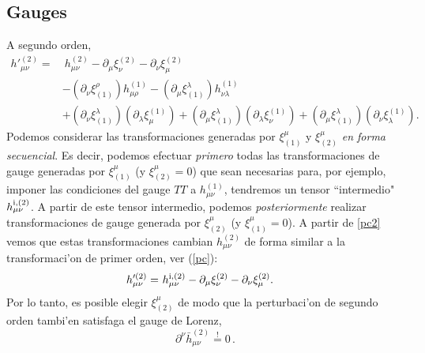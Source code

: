 \subsection{Gauges}
A segundo orden,
\begin{align}\label{pc2}
h'^{(2)}_{\mu\nu} = &\ h^{(2)}_{\mu\nu}- \partial_\mu\xi_\nu^{(2)} - \partial_\nu\xi_\mu^{(2)}\\
&  -(\partial_\nu\xi^\rho_{(1)})h^{(1)}_{\mu\rho} -(\partial_\mu\xi^\lambda_{(1)})h^{(1)}_{\nu\lambda} \\
& +(\partial_\nu\xi^\lambda_{(1)})(\partial_\lambda\xi_\mu^{(1)})
+(\partial_\mu\xi^\lambda_{(1)})(\partial_\lambda\xi_\nu^{(1)})
+(\partial_\mu\xi^\lambda_{(1)})(\partial_\nu\xi_\lambda^{(1)}).
\end{align}
Podemos considerar las transformaciones generadas por $\xi^\mu_{(1)}$ y $\xi^\mu_{(2)}$ \textit{en forma secuencial}. Es decir, podemos efectuar \textit{primero} todas las transformaciones de gauge generadas por $\xi^\mu_{(1)}$ (y $\xi^\mu_{(2)}=0$) que sean necesarias para, por ejemplo, imponer las condiciones del gauge $TT$ a $h^{(1)}_{\mu\nu}$,  tendremos un tensor ``intermedio" $h^{\rm i, (2)}_{\mu\nu}$. A partir de este tensor intermedio, podemos \textit{posteriormente} realizar transformaciones de gauge generada por $\xi^\mu_{(2)}$ (y $\xi^\mu_{(1)}=0$). A partir de \eqref{pc2} vemos que estas transformaciones cambian $h^{(2)}_{\mu\nu}$ de forma similar a la transformaci'on de primer orden, ver (\ref{pc}):
\begin{align}\label{pc2b}
h'^{(2)}_{\mu\nu} = &\ h^{\rm i,(2)}_{\mu\nu}- \partial_\mu\xi_\nu^{(2)} - \partial_\nu\xi_\mu^{(2)}.
\end{align}
Por lo tanto, es posible elegir $\xi^\mu_{(2)}$ de modo que la perturbaci'on de segundo orden tambi'en satisfaga el gauge de Lorenz,
\begin{equation} \label{lgauge2}
\partial^\nu\bar{h}^{(2)}_{\mu\nu}\stackrel{!}{=} 0 \, .
\end{equation}

